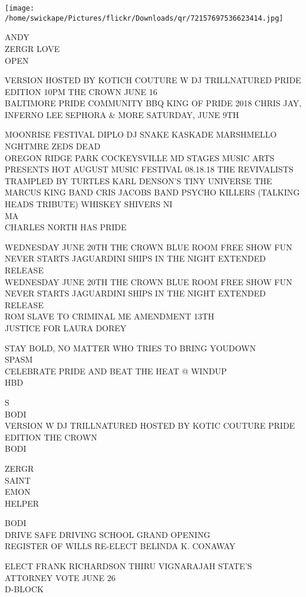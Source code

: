 \documentclass[10pt,letterpaper]{article}
\begin{document}
\texttt{[image: /home/swickape/Pictures/flickr/Downloads/qr/72157697536623414.jpg]}
\pagebreak

ANDY\\
ZERGR LOVE\\
OPEN

VERSION HOSTED BY KOTICH COUTURE W DJ TRILLNATURED PRIDE EDITION 10PM THE CROWN JUNE 16\\
BALTIMORE PRIDE COMMUNITY BBQ KING OF PRIDE 2018 CHRIS JAY, INFERNO LEE SEPHORA \& MORE SATURDAY, JUNE 9TH

MOONRISE FESTIVAL DIPLO DJ SNAKE KASKADE MARSHMELLO NGHTMRE ZEDS DEAD\\
OREGON RIDGE PARK COCKEYSVILLE MD STAGES MUSIC ARTS PRESENTS HOT AUGUST MUSIC FESTIVAL 08.18.18 THE REVIVALISTS TRAMPLED BY TURTLES KARL DENSON'S TINY UNIVERSE THE MARCUS KING BAND CRIS JACOBS BAND PSYCHO KILLERS (TALKING HEADS TRIBUTE) WHISKEY SHIVERS NI\\
MA\\
CHARLES NORTH HAS PRIDE

WEDNESDAY JUNE 20TH THE CROWN BLUE ROOM FREE SHOW FUN NEVER STARTS JAGUARDINI SHIPS IN THE NIGHT EXTENDED RELEASE\\
WEDNESDAY JUNE 20TH THE CROWN BLUE ROOM FREE SHOW FUN NEVER STARTS JAGUARDINI SHIPS IN THE NIGHT EXTENDED RELEASE\\
ROM SLAVE TO CRIMINAL ME AMENDMENT 13TH\\
JUSTICE FOR LAURA DOREY

STAY BOLD, NO MATTER WHO TRIES TO BRING YOUDOWN\\
SPASM\\
CELEBRATE PRIDE AND BEAT THE HEAT @ WINDUP\\
HBD

S\\
BODI\\
VERSION W DJ TRILLNATURED HOSTED BY KOTIC COUTURE PRIDE EDITION THE CROWN\\
BODI

ZERGR\\
SAINT\\
EMON\\
HELPER

BODI\\
DRIVE SAFE DRIVING SCHOOL GRAND OPENING\\
REGISTER OF WILLS RE{-}ELECT BELINDA K. CONAWAY

ELECT FRANK RICHARDSON THIRU VIGNARAJAH STATE'S ATTORNEY VOTE JUNE 26\\
D{-}BLOCK
\end{document}
